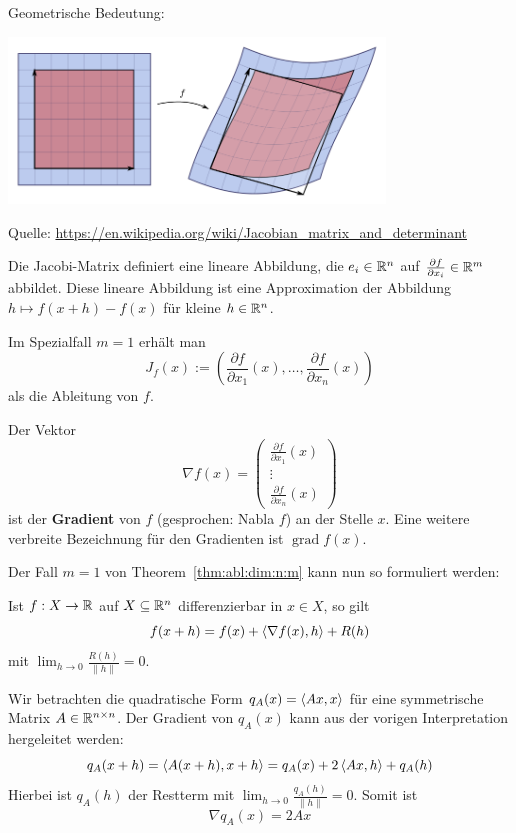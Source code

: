 \begin{bem} 
	Geometrische Bedeutung: 
	
	\begin{center}
		\includegraphics[width=10cm]{pics/jacobian.png}
	\end{center}

	{ \scriptsize Quelle: \url{https://en.wikipedia.org/wiki/Jacobian_matrix_and_determinant} }


	Die Jacobi-Matrix definiert eine lineare Abbildung, die $e_i \in \mathbb{R}^n$ auf $\frac{\partial f}{\partial x_i} \in \mathbb{R}^m$ abbildet. Diese lineare Abbildung ist eine Approximation der Abbildung $h \mapsto f(x+h) - f(x)$ für kleine $h \in \mathbb{R}^n$. 
\end{bem}



\begin{bem}
	Im Spezialfall $m=1$ erhält man 
	\[
		J_f(x) := \left( \frac{\partial f}{\partial x_1} (x),\ldots, \frac{\partial f}{\partial x_n} (x) \right)
	\] als die Ableitung von $f$. 
	
	Der Vektor 
	\[
		\nabla f (x) = \begin{pmatrix} \frac{\partial f}{\partial x_1} (x) \\ \vdots \\ \frac{\partial f}{\partial x_n} (x) \end{pmatrix} 
	\] ist der \textbf{Gradient}  von $f$ (gesprochen: Nabla $f$) an der Stelle $x$. Eine weitere verbreite Bezeichnung für den Gradienten ist $\operatorname{grad} f (x)$. 
\end{bem} 


\begin{bem}
	Der Fall $m=1$ von Theorem~\ref{thm:abl:dim:n:m} kann nun so formuliert werden: 
	
	
	Ist $ f : X \to \mathbb{R}$ auf $X \subseteq \mathbb{R}^n$ differenzierbar in $x \in X$, so gilt 
	\[
		f(x+h) = f(x) + \left< \nabla f(x) , h \right> + R(h)
	\]
	mit $\lim_{h \to 0} \frac{R(h)}{\|h\|}  = 0$. 
\end{bem} 

\begin{bsp} 
	Wir betrachten die quadratische Form $q_A(x) = \left< A x , x \right>$ für eine symmetrische Matrix $A \in \mathbb{R}^{n \times n}$. Der Gradient von $q_A(x)$ kann aus der vorigen Interpretation hergeleitet werden: 
	\[
		q_A(x+h) = \left< A(x+h) , x+h \right> = q_A(x) + 2 \left< A x , h \right> + q_A(h)
	\]
	Hierbei ist $q_A(h)$ der Restterm mit $\lim_{h \to 0} \frac{q_A(h)}{\|h\|} = 0$. Somit ist 
	\[
		\nabla q_A (x) = 2 A x
	\]
\end{bsp} 

